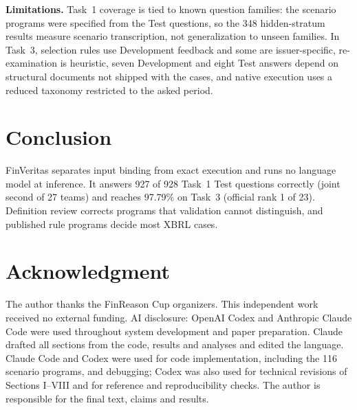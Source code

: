 \documentclass[conference]{IEEEtran}
\begin{document}
\textbf{Limitations.} Task~1 coverage is tied to known question families: the scenario programs were specified from the Test questions, so the 348 hidden-stratum results measure scenario transcription, not generalization to unseen families. In Task~3, selection rules use Development feedback and some are issuer-specific, re-examination is heuristic, seven Development and eight Test answers depend on structural documents not shipped with the cases, and native execution uses a reduced taxonomy restricted to the asked period.

\section{Conclusion}
FinVeritas separates input binding from exact execution and runs no language model at inference. It answers 927 of 928 Task~1 Test questions correctly (joint second of 27 teams) and reaches 97.79\% on Task~3 (official rank 1 of 23). Definition review corrects programs that validation cannot distinguish, and published rule programs decide most XBRL cases.

\section*{Acknowledgment}
The author thanks the FinReason Cup organizers. This independent work received no external funding. AI disclosure: OpenAI Codex and Anthropic Claude Code were used throughout system development and paper preparation. Claude drafted all sections from the code, results and analyses and edited the language. Claude Code and Codex were used for code implementation, including the 116 scenario programs, and debugging; Codex was also used for technical revisions of Sections I--VIII and for reference and reproducibility checks. The author is responsible for the final text, claims and results.



\end{document}
